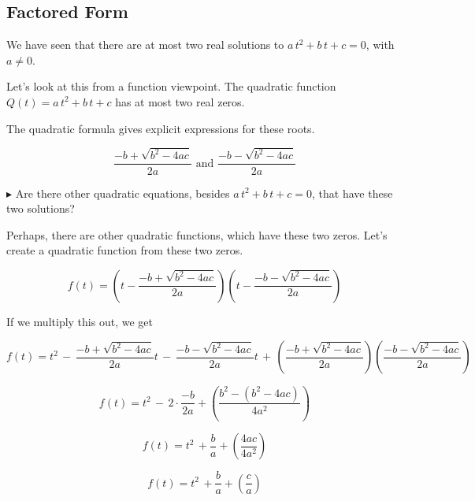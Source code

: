 \documentclass{ximera}
\begin{document}
\subsection*{Factored Form}










We have seen that there are at most two real solutions to $a \, t^2 + b \, t + c = 0$, with $a \ne 0$. 

Let's look at this from a function viewpoint.  The quadratic function  $Q(t) = a \, t^2 + b \, t + c$ has at most two real zeros.  

The quadratic formula gives explicit expressions for these roots.


\[   \frac{-b + \sqrt{b^2 - 4 a c}}{2a}     \text{ and }    \frac{-b - \sqrt{b^2 - 4 a c}}{2a}   \]





$\blacktriangleright$  Are there other quadratic equations, besides $a \, t^2 + b \, t + c = 0$, that have these two solutions?















Perhaps, there are other quadratic functions, which have these two zeros. Let's create a quadratic function from these two zeros.



\[ f(t) =  \left(t - \frac{-b + \sqrt{b^2 - 4 a c}}{2a}\right)   \left(t -  \frac{-b - \sqrt{b^2 - 4 a c}}{2a}\right)   \]


If we multiply this out, we get



\[ f(t) =   t^2 \, - \, \frac{-b + \sqrt{b^2 - 4 a c}}{2a} t \, - \, \frac{-b - \sqrt{b^2 - 4 a c}}{2a}  t \, + \, \left(\frac{-b + \sqrt{b^2 - 4 a c}}{2a}\right) \left(\frac{-b - \sqrt{b^2 - 4 a c}}{2a}\right) \]


\[ f(t) = t^2  \, - \, 2 \cdot \frac{-b}{2a} + \left(    \frac{b^2 - (b^2 - 4 a c)}{4 a^2}     \right)        \]


\[ f(t) = t^2  \, + \frac{b}{a} + \left(    \frac{4 a c}{4 a^2}     \right)        \]

\[ f(t) = t^2  \, +  \frac{b}{a} + \left(    \frac{c}{a}     \right)        \]
\end{document}
